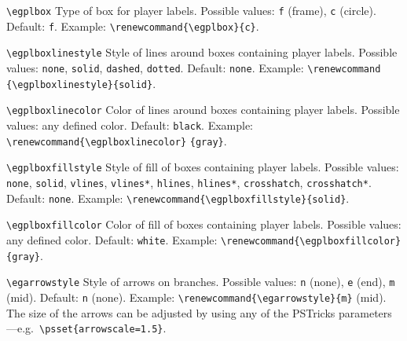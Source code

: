 \documentclass[12pt]{article}
\begin{document}
\noindent\verb+\egplbox+\newline
\noindent Type of box for player labels.  Possible values: \verb+f+ (frame),
\verb+c+ (circle).  Default: \verb+f+.  Example:
\verb+\renewcommand{\egplbox}{c}+.

\vspace{4mm}

\sloppy
\noindent\verb+\egplboxlinestyle+\newline
\noindent Style of lines around boxes containing player labels.  Possible
values: \verb+none+, \verb+solid+, \verb+dashed+, \verb+dotted+.  Default:
\verb+none+.  Example: \verb+\renewcommand+ \verb+{\egplboxlinestyle}{solid}+.

\fussy
\vspace{4mm}

\noindent\verb+\egplboxlinecolor+\newline
\noindent Color of lines around boxes containing player labels.  Possible
values: any defined color.  Default: \verb+black+.  Example:
\verb+\renewcommand{\egplboxlinecolor}+ \verb+{gray}+.

\vspace{4mm}

\noindent\verb+\egplboxfillstyle+\newline
\noindent Style of fill of boxes containing player labels.  Possible values:
\verb+none+, \verb+solid+, \verb+vlines+, \verb+vlines*+, \verb+hlines+,
\verb+hlines*+, \verb+crosshatch+, \verb+crosshatch*+.  Default: \verb+none+. 
Example: \verb+\renewcommand{\egplboxfillstyle}{solid}+.

\vspace{4mm}

\sloppy
\noindent\verb+\egplboxfillcolor+\newline
\noindent Color of fill of boxes containing player labels.  Possible values:
any defined color.  Default: \verb+white+.  Example:
\verb+\renewcommand{\egplboxfillcolor}+ \verb+{gray}+.

\fussy
\vspace{4mm}

\noindent\verb+\egarrowstyle+\newline
\noindent Style of arrows on branches.  Possible values: \verb+n+ (none),
\verb+e+ (end), \verb+m+ (mid).  Default: \verb+n+ (none).  Example:
\verb+\renewcommand{\egarrowstyle}{m}+ (mid).  The size of the arrows can be
adjusted by using any of the PSTricks parameters---e.g.\
\verb+\psset{arrowscale=1.5}+.

\vspace{4mm}
\end{document}

